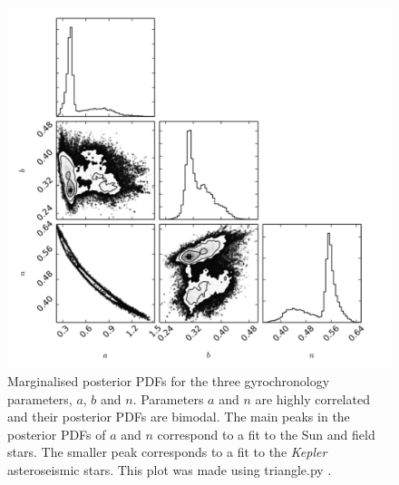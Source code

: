 \begin{figure}
\begin{center}
\includegraphics[width=6in, clip=false, trim=0 0 0.5in 0]{figures/small_triangleACHF.pdf}
\caption[Marginal posteriors of gyrochronology parameters]
{Marginalised posterior PDFs for the three gyrochronology
parameters, $a$, $b$ and $n$.
Parameters $a$ and $n$ are highly correlated and their
posterior PDFs are bimodal. The main peaks in the posterior PDFs of $a$ and
$n$ correspond to a fit to the Sun and field stars. The smaller peak
corresponds to a fit to the {\it Kepler} asteroseismic stars.
This plot was made using triangle.py
\citep{Corner}.
\label{fig:gyro_triangle}}
\end{center}
\end{figure}

